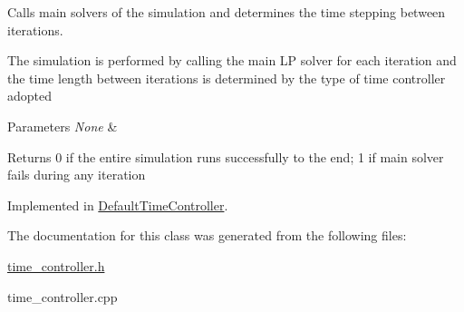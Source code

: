 Calls main solvers of the simulation and determines the time stepping between iterations. 

The simulation is performed by calling the main L\-P solver for each iteration and the time length between iterations is determined by the type of time controller adopted


\begin{DoxyParams}{Parameters}
{\em None} & \\
\hline
\end{DoxyParams}
\begin{DoxyReturn}{Returns}
0 if the entire simulation runs successfully to the end; 1 if main solver fails during any iteration 
\end{DoxyReturn}


Implemented in \hyperlink{classDefaultTimeController_a25ac85307f49f9f304a78d648b5676d7}{Default\-Time\-Controller}.



The documentation for this class was generated from the following files\-:\begin{DoxyCompactItemize}
\item 
\hyperlink{time__controller_8h}{time\-\_\-controller.\-h}\item 
time\-\_\-controller.\-cpp\end{DoxyCompactItemize}
